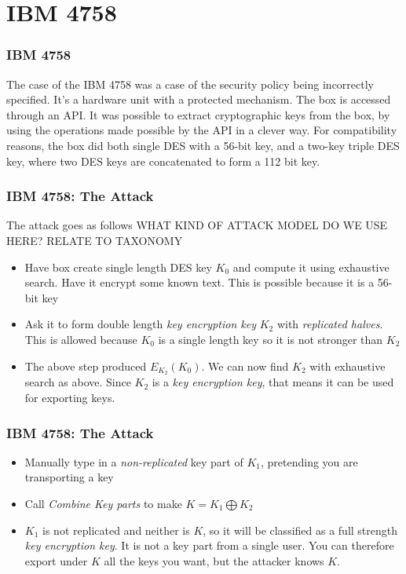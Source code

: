 \section{IBM 4758}
        \begin{frame}
            \frametitle{IBM 4758}
                The case of the IBM 4758 was a case of the security policy being incorrectly specified. 
                It's a hardware unit with a protected mechanism. The box is accessed through an API. It was possible to extract cryptographic keys from the box, by using the operations made possible by the API in a clever way. For compatibility reasons, the box did both single DES with a 56-bit key, and a two-key triple DES key, where two DES keys are concatenated to form a 112 bit key. 
        \end{frame}
        \begin{frame}
            \frametitle{IBM 4758: The Attack}
                The attack goes as follows
                WHAT KIND OF ATTACK MODEL DO WE USE HERE? RELATE TO TAXONOMY
                \begin{itemize}
                    \item Have box create single length DES key $K_0$ and compute it using exhaustive search. Have it encrypt some known text. This is possible because it is a 56-bit key
                    \item Ask it to form double length \textit{key encryption key} $K_2$ with \textit{replicated halves}. This is allowed because $K_0$ is a single length key so it is not stronger than $K_2$
                    \item The above step produced $E_{K_2}(K_0)$. We can now find $K_2$ with exhaustive search as above. Since $K_2$ is a \textit{key encryption key}, that means it can be used for exporting keys. 
                \end{itemize}
        \end{frame}
        \begin{frame}
            \frametitle{IBM 4758: The Attack}
                \begin{itemize}
                    \item Manually type in a \textit{non-replicated} key part of $K_1$, pretending you are transporting a key
                    \item Call \textit{Combine Key parts} to make $K = K_1 \bigoplus K_2$
                    \item $K_1$ is not replicated and neither is $K$, so it will be classified as a full strength \textit{key encryption key}. It is not a key part from a single user. You can therefore export under $K$ all the keys you want, but the attacker knows $K$.
                \end{itemize}
        \end{frame}



